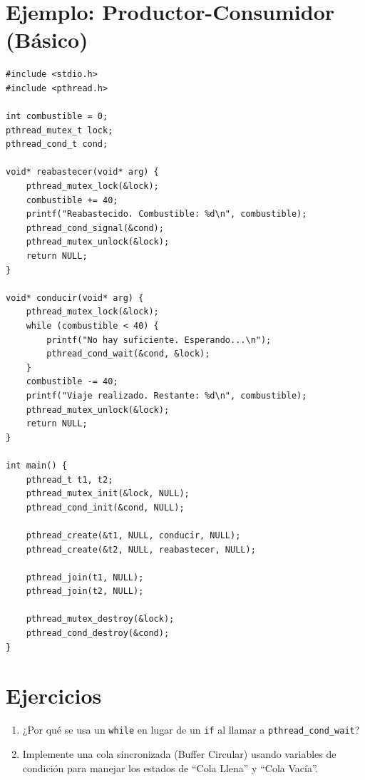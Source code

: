 \documentclass[12pt,a4paper]{article}
\begin{document}
\section{Ejemplo: Productor-Consumidor (Básico)}
\begin{lstlisting}
#include <stdio.h>
#include <pthread.h>

int combustible = 0;
pthread_mutex_t lock;
pthread_cond_t cond;

void* reabastecer(void* arg) {
    pthread_mutex_lock(&lock);
    combustible += 40;
    printf("Reabastecido. Combustible: %d\n", combustible);
    pthread_cond_signal(&cond);
    pthread_mutex_unlock(&lock);
    return NULL;
}

void* conducir(void* arg) {
    pthread_mutex_lock(&lock);
    while (combustible < 40) {
        printf("No hay suficiente. Esperando...\n");
        pthread_cond_wait(&cond, &lock);
    }
    combustible -= 40;
    printf("Viaje realizado. Restante: %d\n", combustible);
    pthread_mutex_unlock(&lock);
    return NULL;
}

int main() {
    pthread_t t1, t2;
    pthread_mutex_init(&lock, NULL);
    pthread_cond_init(&cond, NULL);

    pthread_create(&t1, NULL, conducir, NULL);
    pthread_create(&t2, NULL, reabastecer, NULL);

    pthread_join(t1, NULL);
    pthread_join(t2, NULL);

    pthread_mutex_destroy(&lock);
    pthread_cond_destroy(&cond);
}
\end{lstlisting}

\section{Ejercicios}
\begin{enumerate}
    \item ¿Por qué se usa un \texttt{while} en lugar de un \texttt{if} al llamar a \texttt{pthread\_cond\_wait}?
    \item Implemente una cola sincronizada (Buffer Circular) usando variables de condición para manejar los estados de ``Cola Llena'' y ``Cola Vacía''.
\end{enumerate}
\end{document}
